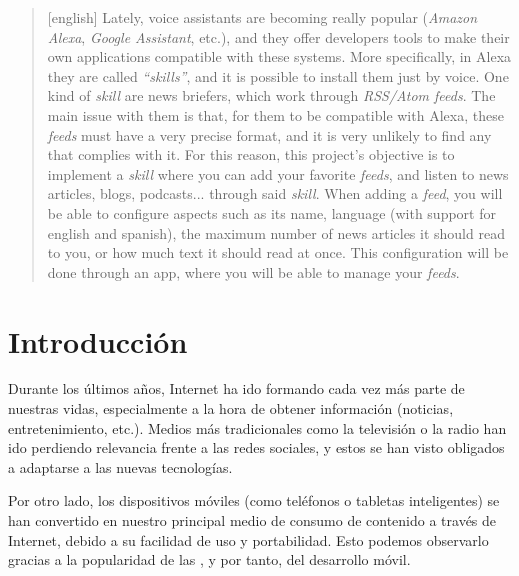 \documentclass[11pt,spanish,listoffigures,listoftables,table,hyphens,dvipsnames]{tfgetsinf}
\newcommand{\fe}[1]{\foreign{english}{#1}}
\begin{document}
\begin{abstract}[english]
   Lately, voice assistants are becoming really popular (\emph{Amazon Alexa}, \emph{Google Assistant}, etc.), and they offer developers tools to make their own applications compatible with these systems. More specifically, in Alexa they are called \emph{``skills''}, and it is possible to install them just by voice. One kind of \textit{skill} are news briefers, which work through \emph{RSS/Atom feeds}. The main issue with them is that, for them to be compatible with Alexa, these \textit{feeds} must have a very precise format, and it is very unlikely to find any that complies with it. For this reason, this project's objective is to implement a \textit{skill} where you can add your favorite \textit{feeds}, and listen to news articles, blogs, podcasts... through said \textit{skill}. When adding a \textit{feed}, you will be able to configure aspects such as its name, language (with support for english and spanish), the maximum number of news articles it should read to you, or how much text it should read at once. This configuration will be done through an app, where you will be able to manage your \textit{feeds}.
\end{abstract}


\mainmatter


\chapter{Introducción}

Durante los últimos años, Internet ha ido formando cada vez más parte de nuestras vidas, especialmente a la hora de obtener información (noticias, entretenimiento, etc.). Medios más tradicionales como la televisión o la radio han ido perdiendo relevancia frente a las redes sociales, y estos se han visto obligados a adaptarse a las nuevas tecnologías.

Por otro lado, los dispositivos móviles (como teléfonos o tabletas inteligentes) se han convertido en nuestro principal medio de consumo de contenido a través de Internet, debido a su facilidad de uso y portabilidad. Esto podemos observarlo gracias a la popularidad de las \fe{apps}, y por tanto, del desarrollo móvil.
\end{document}
